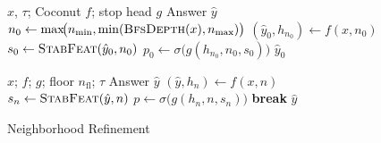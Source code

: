 \vspace{-3mm}
\begin{figure}[H]
\centering
\begin{minipage}[t]{0.48\linewidth}
\begin{algorithm}[H]
\caption{Confidence Fallback}
\label{alg:conf-fallback}
\footnotesize
\begin{algorithmic}[1]
\Require $x$, $\tau$; Coconut $f$; stop head $g$
\Ensure Answer $\hat{y}$
\State $n_0 \gets \max\!\bigl(n_{\min}, \min(\mbox{\textsc{BfsDepth}}(x), n_{\max})\bigr)$
\State $(\hat{y}_0, h_{n_0}) \gets f(x, n_0)$
\State $s_0 \gets \mbox{\textsc{StabFeat}}(\hat{y}_0, n_0)$
\State $p_0 \gets \sigma\bigl(g(h_{n_0}, n_0, s_0)\bigr)$
    \State \Return $\hat{y}_0$
\Else
    \State \Return \mbox{}
\EndIf
\end{algorithmic}
\end{algorithm}
\end{minipage}\hfill
\begin{minipage}[t]{0.48\linewidth}
\begin{algorithm}[H]
\caption{Neighborhood Refinement}
\label{alg:refinement}
\footnotesize
\begin{algorithmic}[1]
\Require $x$; $f$; $g$; floor $n_{\mathrm{fl}}$; $\tau$
\Ensure Answer $\hat{y}$
    \State $(\hat{y}, h_n) \gets f(x, n)$
    \State $s_n \gets \mbox{\textsc{StabFeat}}(\hat{y}, n)$
    \State $p \gets \sigma\bigl(g(h_n, n, s_n)\bigr)$
        \State \textbf{break}
    \EndIf
\EndFor
\State \Return $\hat{y}$
\end{algorithmic}
\end{algorithm}
\end{minipage}
\end{figure}
\vspace{-3mm}
